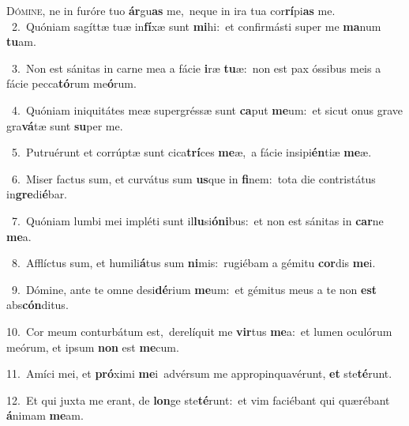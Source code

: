 \lettrine{\initial\textcolor{\initialcolor}{D}}{ómine,} ne in furóre tuo \textbf{ár}\-gu\textbf{as} me,~\star neque in ira tua cor\-\textbf{rí}\-pi\textbf{as} me.\\
{\numbfont\textcolor{\numbcolor}{~2.}}~Quóniam sagíttæ tuæ in\-\textbf{fí}\-xæ sunt \textbf{mi}\-hi:~\star et confirmásti super me \textbf{ma}\-num \textbf{tu}\-am.\par
{\numbfont\textcolor{\numbcolor}{~3.}}~Non est sánitas in carne mea a fácie \textbf{i}\-ræ \textbf{tu}\-æ:~\star non est pax óssibus meis a fácie pecca\-\textbf{tó}\-rum me\-\textbf{ó}\-rum.\par
{\numbfont\textcolor{\numbcolor}{~4.}}~Quóniam iniquitátes meæ supergréssæ sunt \textbf{ca}\-put \textbf{me}\-um:~\star et sicut onus grave gra\-\textbf{vá}\-tæ sunt \textbf{su}\-per me.\par
{\numbfont\textcolor{\numbcolor}{~5.}}~Putruérunt et corrúptæ sunt cica\-\textbf{trí}\-ces \textbf{me}\-æ,~\star a fácie insipi\-\textbf{én}\-tiæ \textbf{me}\-æ.\par
{\numbfont\textcolor{\numbcolor}{~6.}}~Miser factus sum, et curvátus sum \textbf{us}\-que in \textbf{fi}\-nem:~\star tota die contristátus in\-\textbf{gre}\-di\-\textbf{é}\-bar.\par
{\numbfont\textcolor{\numbcolor}{~7.}}~Quóniam lumbi mei impléti sunt il\-\textbf{lu}\-si\-\textbf{ó}\-\textbf{ni}bus:~\star et non est sánitas in \textbf{car}\-ne \textbf{me}\-a.\par
{\numbfont\textcolor{\numbcolor}{~8.}}~Afflíctus sum, et humili\-\textbf{á}\-tus sum \textbf{ni}\-mis:~\star rugiébam a gémitu \textbf{cor}\-dis \textbf{me}\-i.\par
{\numbfont\textcolor{\numbcolor}{~9.}}~Dómine, ante te omne desi\-\textbf{dé}\-rium \textbf{me}\-um:~\star et gémitus meus a te non \textbf{est} abs\-\textbf{cón}\-ditus.\par
{\numbfont\textcolor{\numbcolor}{10.}}~Cor meum conturbátum est,~\dagger derelíquit me \textbf{vir}\-tus \textbf{me}\-a:~\star et lumen oculórum meórum, et ipsum \textbf{non} est \textbf{me}\-cum.\par
{\numbfont\textcolor{\numbcolor}{11.}}~Amíci mei, et \textbf{pró}\-ximi \textbf{me}\-i~\star advérsum me appropinquavérunt, \textbf{et} ste\-\textbf{té}\-runt.\par
{\numbfont\textcolor{\numbcolor}{12.}}~Et qui juxta me erant, de \textbf{lon}\-ge ste\-\textbf{té}\-runt:~\star et vim faciébant qui quærébant \textbf{á}\-nimam \textbf{me}\-am.\par
